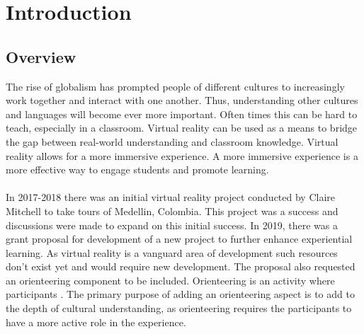 \section{Introduction}
\label{sec:Introduction}

\subsection{Overview} 
The rise of globalism has prompted people of different cultures to increasingly work together and interact with one another. Thus, understanding other cultures and languages will become ever more important. Often times this can be hard to teach, especially in a classroom. Virtual reality can be used as a means to bridge the gap between real-world understanding and classroom knowledge. Virtual reality allows for a more immersive experience. A more immersive experience is a more effective way to engage students and promote learning. \\
\\
In 2017-2018 there was an initial virtual reality project conducted by Claire Mitchell to take tours of Medellin, Colombia. This project was a success and discussions were made to expand on this initial success. In 2019, there was a grant proposal for development of a new project to further enhance experiential learning. As virtual reality is a vanguard area of development such resources don't exist yet and would require new development. The proposal also requested an orienteering component to be included. Orienteering is an activity where participants . The primary purpose of adding an orienteering aspect is to add to the depth of cultural understanding, as orienteering requires the participants to have a more active role in the experience. 
